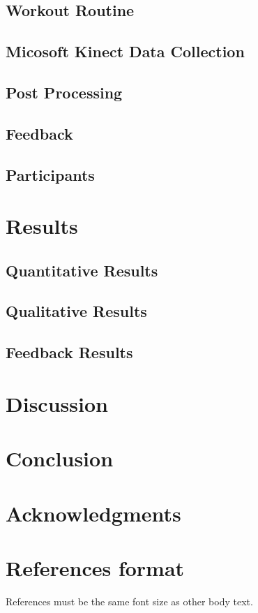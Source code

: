 \documentclass{sigchi}
\begin{document}
\subsection{Workout Routine}


\subsection{Micosoft Kinect Data Collection}


\subsection{Post Processing}


\subsection{Feedback}


\subsection{Participants}


\section{Results}


\subsection{Quantitative Results}


\subsection{Qualitative Results}


\subsection{Feedback Results}


\section{Discussion}


\section{Conclusion}


\section{Acknowledgments}


\section{References format}
References must be the same font size as other body text.



\end{document}
